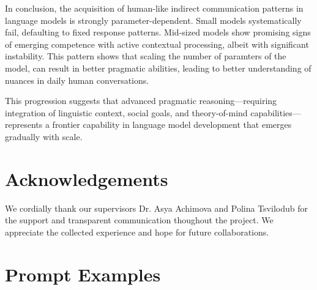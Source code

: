 \documentclass[11pt]{article}
\begin{document}
In conclusion, the acquisition of human-like indirect communication patterns in language models is strongly parameter-dependent. Small models systematically fail, defaulting to fixed response patterns. Mid-sized models show promising signs of emerging competence with active contextual processing, albeit with significant instability. This pattern shows that scaling the number of paramters of the model, can result in better pragmatic abilities, leading to better understanding of nuances in daily human conversations. 

This progression suggests that advanced pragmatic reasoning—requiring integration of linguistic context, social goals, and theory-of-mind capabilities—represents a frontier capability in language model development that emerges gradually with scale.





\section*{Acknowledgements}

 We cordially thank our supervisors Dr. Asya Achimova and Polina Tsvilodub for the support and transparent communication thoughout the project. We appreciate the collected experience and hope for future collaborations.






\newpage %

\appendix
\section{Prompt Examples}
\label{sec:appendix:prompts}
\end{document}
